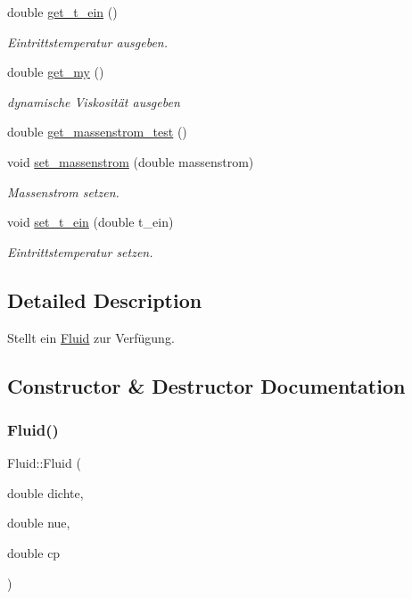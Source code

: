 \begin{DoxyCompactItemize}
double \hyperlink{class_fluid_a60d0c9269a8c8af00bf8828c7f764537}{get\+\_\+t\+\_\+ein} ()
\begin{DoxyCompactList}\small\item\em Eintrittstemperatur ausgeben. \end{DoxyCompactList}\item 
double \hyperlink{class_fluid_a80d39a71b73f5ac4cffcaceb61b9e0ee}{get\+\_\+my} ()
\begin{DoxyCompactList}\small\item\em dynamische Viskosität ausgeben \end{DoxyCompactList}\item 
double \hyperlink{class_fluid_ac30c9c13d0bc8094ff28dad837c4eb81}{get\+\_\+massenstrom\+\_\+test} ()
\item 
void \hyperlink{class_fluid_af70884f77d5dd43499fcc70969100498}{set\+\_\+massenstrom} (double massenstrom)
\begin{DoxyCompactList}\small\item\em Massenstrom setzen. \end{DoxyCompactList}\item 
void \hyperlink{class_fluid_a9449846d8fd4bf31d8685eefa55d4a57}{set\+\_\+t\+\_\+ein} (double t\+\_\+ein)
\begin{DoxyCompactList}\small\item\em Eintrittstemperatur setzen. \end{DoxyCompactList}\end{DoxyCompactItemize}


\subsection{Detailed Description}
Stellt ein \hyperlink{class_fluid}{Fluid} zur Verfügung. 

\subsection{Constructor \& Destructor Documentation}
\mbox{\label{class_fluid_a2b1fada8a43d2edf1424e4f5915d6e06}} 
\subsubsection{\texorpdfstring{Fluid()}{Fluid()}}
{\footnotesize\ttfamily Fluid\+::\+Fluid (\begin{DoxyParamCaption}\item[{double}]{dichte,  }\item[{double}]{nue,  }\item[{double}]{cp }\end{DoxyParamCaption})}

